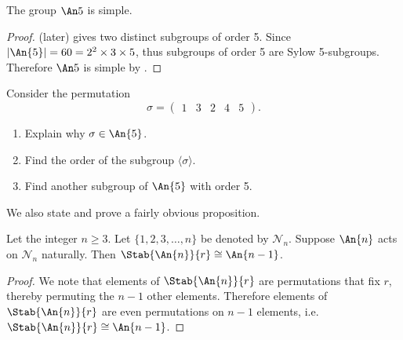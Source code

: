 \begin{corollary}\label{corollary-A5-is-simple}
    The group $\An5$ is simple.
\end{corollary}
\begin{proof}
     (later) gives two distinct subgroups of order 5. Since $|\An{5}| = 60 = 2^2 \times 3 \times 5$, thus subgroups of order 5 are Sylow 5-subgroups. Therefore $\An5$ is simple by . 
\end{proof}
\begin{exercise}\label{exercise-A5-has-two-distinct-subgroups-of-order-5}
    Consider the permutation
    \[
        \sigma = \begin{pmatrix}1&3&2&4&5\end{pmatrix}.
    \]
    \begin{enumerate}[label=(\roman*)]
        \item Explain why $\sigma \in \An{5}$.
        \item Find the order of the subgroup $\langle \sigma \rangle$.
        \item Find another subgroup of $\An{5}$ with order 5.
    \end{enumerate}
\end{exercise}

We also state and prove a fairly obvious proposition.
\begin{proposition}\label{prop-An-stabilizer-of-i-is-isomorphic-to-A(n-1)}
    Let the integer $n \geq 3$. Let $\{1, 2, 3, \dots, n\}$ be denoted by $\mathcal{N}_n$. Suppose $\An{n}$ acts on $\mathcal{N}_n$ naturally. Then $\Stab{\An{n}}{r} \cong \An{n-1}$.
\end{proposition}
\begin{proof}
    We note that elements of $\Stab{\An{n}}{r}$ are permutations that fix $r$, thereby permuting the $n - 1$ other elements. Therefore elements of $\Stab{\An{n}}{r}$ are even permutations on $n - 1$ elements, i.e. $\Stab{\An{n}}{r} \cong \An{n-1}$.
\end{proof}

